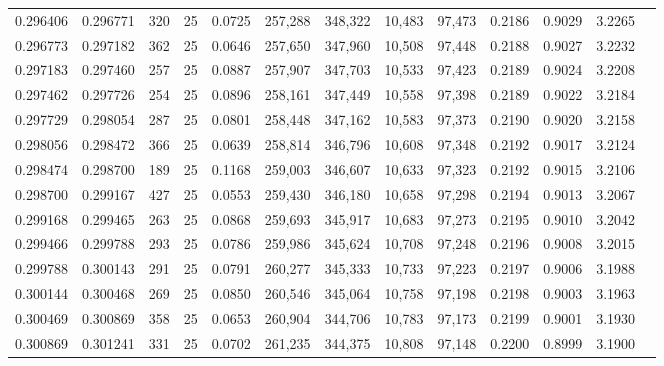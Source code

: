\begin{tabular}{rrrrrrrrrrrrr}
0.296406 & 0.296771 &   320 &  25 &                                     0.0725 & 257,288 & 348,322 &  10,483 &  97,473 & 0.2186 & 0.9029 & 3.2265 \\
0.296773 & 0.297182 &   362 &  25 &                                     0.0646 & 257,650 & 347,960 &  10,508 &  97,448 & 0.2188 & 0.9027 & 3.2232 \\
0.297183 & 0.297460 &   257 &  25 &                                     0.0887 & 257,907 & 347,703 &  10,533 &  97,423 & 0.2189 & 0.9024 & 3.2208 \\
0.297462 & 0.297726 &   254 &  25 &                                     0.0896 & 258,161 & 347,449 &  10,558 &  97,398 & 0.2189 & 0.9022 & 3.2184 \\
0.297729 & 0.298054 &   287 &  25 &                                     0.0801 & 258,448 & 347,162 &  10,583 &  97,373 & 0.2190 & 0.9020 & 3.2158 \\
0.298056 & 0.298472 &   366 &  25 &                                     0.0639 & 258,814 & 346,796 &  10,608 &  97,348 & 0.2192 & 0.9017 & 3.2124 \\
0.298474 & 0.298700 &   189 &  25 &                                     0.1168 & 259,003 & 346,607 &  10,633 &  97,323 & 0.2192 & 0.9015 & 3.2106 \\
0.298700 & 0.299167 &   427 &  25 &                                     0.0553 & 259,430 & 346,180 &  10,658 &  97,298 & 0.2194 & 0.9013 & 3.2067 \\
0.299168 & 0.299465 &   263 &  25 &                                     0.0868 & 259,693 & 345,917 &  10,683 &  97,273 & 0.2195 & 0.9010 & 3.2042 \\
0.299466 & 0.299788 &   293 &  25 &                                     0.0786 & 259,986 & 345,624 &  10,708 &  97,248 & 0.2196 & 0.9008 & 3.2015 \\
0.299788 & 0.300143 &   291 &  25 &                                     0.0791 & 260,277 & 345,333 &  10,733 &  97,223 & 0.2197 & 0.9006 & 3.1988 \\
0.300144 & 0.300468 &   269 &  25 &                                     0.0850 & 260,546 & 345,064 &  10,758 &  97,198 & 0.2198 & 0.9003 & 3.1963 \\
0.300469 & 0.300869 &   358 &  25 &                                     0.0653 & 260,904 & 344,706 &  10,783 &  97,173 & 0.2199 & 0.9001 & 3.1930 \\
0.300869 & 0.301241 &   331 &  25 &                                     0.0702 & 261,235 & 344,375 &  10,808 &  97,148 & 0.2200 & 0.8999 & 3.1900 \\

\end{tabular}

